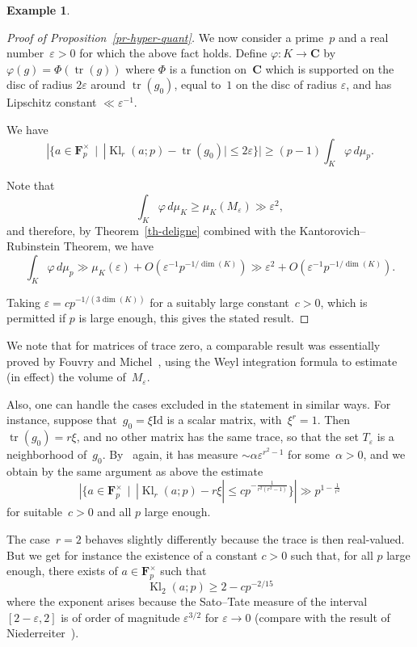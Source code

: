 \documentclass[12pt]{amsart}
\renewcommand{\leq}{\leqslant}
\renewcommand{\geq}{\geqslant}
\newcommand{\Cc}{\mathbf{C}}
\newcommand{\Ff}{\mathbf{F}}
\DeclareMathOperator{\Kl}{Kl}
\DeclareMathOperator{\Tr}{tr}
\newcommand{\eps}{\varepsilon}
\theoremstyle{plain}
\theoremstyle{remark}
\theoremstyle{definition}
\newtheorem{example}[theorem]{Example}
\renewcommand{\geq}{\geqslant}
\renewcommand{\leq}{\leqslant}
\begin{document}
\begin{example}
\begin{proof}[Proof of Proposition~\ref{pr-hyper-quant}]
    We now consider a prime~$p$ and a real number~$\eps>0$ for which the
    above fact holds. Define $\varphi\colon K\to\Cc$ by
    $\varphi(g)=\Phi(\Tr(g))$ where $\Phi$ is a function on~$\Cc$ which
    is supported on the disc of radius $2\eps$ around $\Tr(g_0)$, equal
    to~$1$ on the disc of radius $\eps$, and has Lipschitz constant
    $\ll \eps^{-1}$.

    We have
    \[
      |\{a\in\Ff_p^{\times}\,\mid\, |\Kl_r(a;p)-\Tr(g_0)|\leq
      2\eps\}|\geq (p-1)\int_{K}\varphi\, d\mu_p.
    \]

    Note that 
    \[
      \int_{K}\varphi\, d\mu_K \geq \mu_K(M_{\eps})\gg \eps^2,
    \]
    and therefore, by Theorem~\ref{th-deligne} combined with the
    Kantorovich--Rubinstein Theorem, we have
    \[
      \int_{K}\varphi\, d\mu_p\gg \mu_K(\eps)+
      O(\eps^{-1}p^{-1/\dim(K)})\gg \eps^2+O(\eps^{-1}p^{-1/\dim(K)}).
    \]

    Taking $\eps=cp^{-1/(3\dim(K))}$ for a suitably large
    constant~$c>0$, which is permitted if $p$ is large enough, this
    gives the stated result.
  \end{proof}

  We note that for matrices of trace zero, a comparable result was
  essentially proved by Fouvry and Michel~\cite{fouvry-michel1}, using
  the Weyl integration formula to estimate (in effect) the volume
  of~$M_{\eps}$.

  Also, one can handle the cases excluded in the statement in similar
  ways. For instance, suppose that~$g_0=\xi\mathrm{Id}$ is a scalar
  matrix, with~$\xi^r=1$. Then~$\Tr(g_0)=r\xi$, and no other matrix
  has the same trace, so that the set $T_{\eps}$ is a neighborhood
  of~$g_0$.  By~\cite[Th.\,9.23]{gray} again, it has measure
  $\sim \alpha \eps^{r^2-1}$ for some~$\alpha>0$, and we obtain by the
  same argument as above the estimate
  \[
    |\{a\in\Ff_p^{\times}\,\mid\, |\Kl_r(a;p)-r\xi|\leq
    cp^{-\tfrac{1}{r^2(r^2-1)}}\}|\gg p^{1-\tfrac{1}{r^2}}
  \]
  for suitable~$c>0$ and all $p$ large enough.

  The case~$r=2$ behaves slightly differently because the trace is
  then real-valued. But we get for instance the existence of a
  constant $c>0$ such that, for all $p$ large enough, there exists of
  $a\in\Ff_p^{\times}$ such that
  \[
    \Kl_2(a;p)\geq 2-cp^{-2/15}
  \]
  where the exponent arises because the Sato--Tate measure of the
  interval $[2-\eps,2]$ is of order of magnitude $\eps^{3/2}$ for
  $\eps\to 0$ (compare with the result of
  Niederreiter~\cite{niederreiter}).

\end{example}
\end{document}
